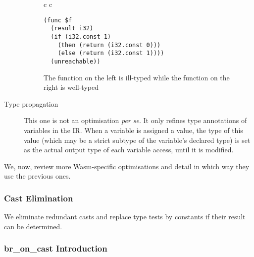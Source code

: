 \documentclass[10pt]{article}
\begin{document}
\begin{description}
\begin{figure}[h]
\begin{tabular}{c c}
\begin{minipage}{2.8in}
\begin{verbatim}
(func $f
  (result i32)
  (if (i32.const 1)
    (then (return (i32.const 0)))
    (else (return (i32.const 1))))
  (unreachable))
\end{verbatim}
\end{minipage}
\end{tabular}
\caption{The function on the left is ill-typed while the function on the right
  is well-typed}\label{unreachable}
\end{figure}
  \item[Type propagation] This one is not an optimisation \emph{per se}. It only
    refines type annotations of variables in the IR. When a variable is assigned
    a value, the type of this value (which may be a strict subtype of the
    variable's declared type) is set as the actual output type of each variable
    access, until it is modified.
\end{description}

We, now, review more Wasm-specific optimisations and detail in which way they
use the previous ones.
\subsubsection{Cast Elimination}
We eliminate redundant casts and replace type tests by constants if their result
can be determined.

\subsubsection{\textsf{br\_on\_cast} Introduction}\label{broncast}
\printbibliography
\end{document}
